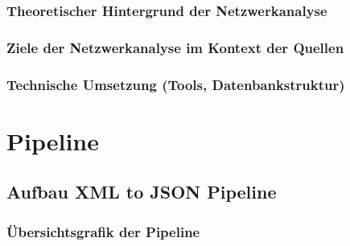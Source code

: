 \documentclass[12pt, a4paper, ngerman, bidi=default]{article}
\begin{document}
  \subsubsection{Theoretischer Hintergrund der Netzwerkanalyse}
  \subsubsection{Ziele der Netzwerkanalyse im Kontext der Quellen}
  \subsubsection{Technische Umsetzung (Tools, Datenbankstruktur)}



\section{Pipeline}

\subsection{Aufbau XML to JSON Pipeline}
\subsubsection{Übersichtsgrafik der Pipeline}


\vspace{6\baselineskip}
\end{document}
